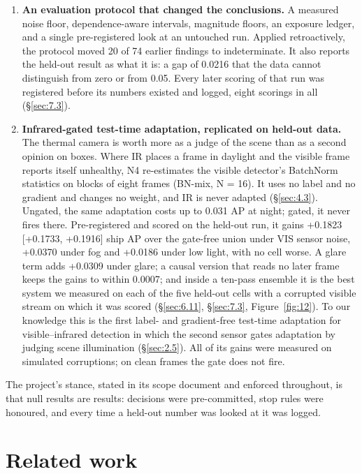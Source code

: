 \documentclass[10pt]{article}
\begin{document}
\begin{enumerate}
\item \textbf{An evaluation protocol that changed the conclusions.} A measured noise floor, dependence-aware intervals, magnitude floors, an exposure ledger, and a single pre-registered look at an untouched run. Applied retroactively, the protocol moved 20 of 74 earlier findings to indeterminate. It also reports the held-out result as what it is: a gap of 0.0216 that the data cannot distinguish from zero or from 0.05. Every later scoring of that run was registered before its numbers existed and logged, eight scorings in all (\S\ref{sec:7.3}).
\item \textbf{Infrared-gated test-time adaptation, replicated on held-out data.} The thermal camera is worth more as a judge of the scene than as a second opinion on boxes. Where IR places a frame in daylight and the visible frame reports itself unhealthy, N4 re-estimates the visible detector's BatchNorm statistics on blocks of eight frames (BN-mix, N = 16). It uses no label and no gradient and changes no weight, and IR is never adapted (\S\ref{sec:4.3}). Ungated, the same adaptation costs up to 0.031 AP at night; gated, it never fires there. Pre-registered and scored on the held-out run, it gains +0.1823 [+0.1733, +0.1916] ship AP over the gate-free union under VIS sensor noise, +0.0370 under fog and +0.0186 under low light, with no cell worse. A glare term adds +0.0309 under glare; a causal version that reads no later frame keeps the gains to within 0.0007; and inside a ten-pass ensemble it is the best system we measured on each of the five held-out cells with a corrupted visible stream on which it was scored (\S\ref{sec:6.11}, \S\ref{sec:7.3}, Figure~\ref{fig:12}). To our knowledge this is the first label- and gradient-free test-time adaptation for visible--infrared detection in which the second sensor gates adaptation by judging scene illumination (\S\ref{sec:2.5}). All of its gains were measured on simulated corruptions; on clean frames the gate does not fire.
\end{enumerate}

The project's stance, stated in its scope document and enforced throughout, is that null results are results: decisions were pre-committed, stop rules were honoured, and every time a held-out number was looked at it was logged.

\section{Related work}\label{sec:2}
\end{document}
